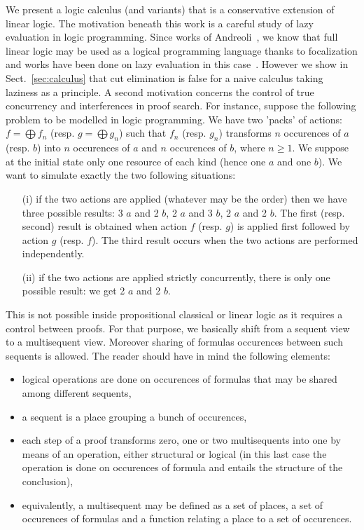 \documentclass{llncs}
\begin{document}
We present a logic calculus (and variants) that is a conservative extension of linear logic. 
The motivation beneath this work is a careful study of lazy evaluation in logic programming. Since works of Andreoli~\cite{Andreoli92}, we know that full linear logic may be used as a logical programming language thanks to focalization and works have been done on lazy evaluation in this case~\cite{DBLP:conf/elp/CervesatoHP96}. However we show in Sect.~\ref{sec:calculus} that cut elimination is false for a naive calculus taking laziness as a principle. A second motivation concerns the control of true concurrency and interferences in proof search. For instance, suppose the following problem to be modelled in logic programming. We have two 'packs' of actions: $f = \bigoplus f_n$ (resp. $g = \bigoplus g_n$) such that $f_n$ (resp. $g_n$) transforms $n$ occurences of $a$ (resp. $b$) into $n$ occurences of $a$ and $n$ occurences of $b$, where $n\geq 1$. We suppose at the initial state only one resource
of each kind (hence one $a$ and one $b$).
We want to simulate exactly the two following situations: 
\begin{itemize}
\item[(i)] if the two actions are applied (whatever may be the order) then we have three possible results:
3 $a$ and 2 $b$, 2 $a$ and 3 $b$, 2 $a$ and 2 $b$. The first (resp. second) result is obtained when action $f$ (resp. $g$) is applied first followed by action $g$ (resp. $f$). The third result occurs when the two actions are performed independently.
\item[(ii)] if the two actions are applied strictly concurrently, there is only one possible result: we get 2 $a$ and 2 $b$.
\end{itemize}
This is not possible inside propositional classical or linear logic as it requires a control between proofs.
For that purpose, we basically shift from a sequent view to a multisequent view. Moreover sharing of formulas occurences between such sequents is allowed. The reader should have in mind the following elements:
\begin{itemize}
\item logical operations are done on occurences of formulas that may be shared among different sequents,
\item a sequent is a place grouping a bunch of occurences,
\item each step of a proof transforms zero, one or two multisequents into one by means of an operation, either structural or logical (in this last case the operation is done on occurences of formula and entails the structure of the conclusion),
\item equivalently, a multisequent may be defined as a set of places, a set of occurences of formulas and a function relating a place to a set of occurences.
\end{itemize}
\end{document}
